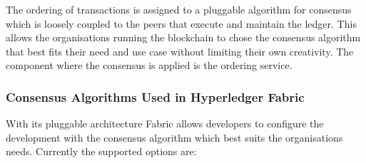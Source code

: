 The ordering of transactions is assigned to a pluggable algorithm for consensus which is loosely coupled to the peers that execute and maintain the ledger. This allows the organisations running the blockchain to chose the consensus algorithm that best fits their need and use case without limiting their own creativity. The component where the consensus is applied is the ordering service. 

\subsubsection{Consensus Algorithms Used in Hyperledger Fabric}

With its pluggable architecture Fabric allows developers to configure the development with the consensus algorithm which best suits the organisations needs. Currently the supported options are: 

